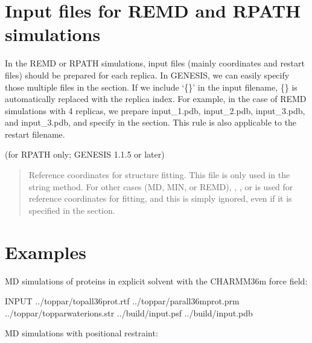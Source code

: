 \documentclass[a4paper,11pt,oneside,english]{sphinxmanual}
\begin{document}
\section{Input files for REMD and RPATH simulations}
\label{\detokenize{03_Input:input-files-for-remd-and-rpath-simulations}}
In the REMD or RPATH simulations, input files (mainly coordinates and restart files)
should be prepared for each replica.
In GENESIS, we can easily specify those multiple files in the \sphinxstylestrong{{[}INPUT{]}} section.
If we include ‘\{\}’ in the input filename, \{\} is automatically replaced with the replica index.
For example, in the case of REMD simulations with 4 replicas,
we prepare input\_1.pdb, input\_2.pdb, input\_3.pdb, and input\_3.pdb,
and specify  in the \sphinxstylestrong{{[}INPUT{]}} section.
This rule is also applicable to the restart filename.

 (for RPATH only; GENESIS 1.1.5 or later)
\begin{quote}

Reference coordinates for structure fitting.
This file is only used in the string method.
For other cases (MD, MIN, or REMD),
, , or  is used for reference coordinates for fitting,
and this  is simply ignored, even if it is specified in the \sphinxstylestrong{{[}INPUT{]}} section.
\end{quote}


\section{Examples}
\label{\detokenize{03_Input:examples}}
MD simulations of proteins in explicit solvent with the CHARMM36m force field:

\begin{sphinxVerbatim}[commandchars=\\\{\}]
\PYG{o}{[}INPUT\PYG{o}{]}
  ../toppar/top\PYGZus{}all36\PYGZus{}prot.rtf
  ../toppar/par\PYGZus{}all36m\PYGZus{}prot.prm
  ../toppar/toppar\PYGZus{}water\PYGZus{}ions.str
  ../build/input.psf
  ../build/input.pdb
\end{sphinxVerbatim}

MD simulations with positional restraint:
\end{document}

